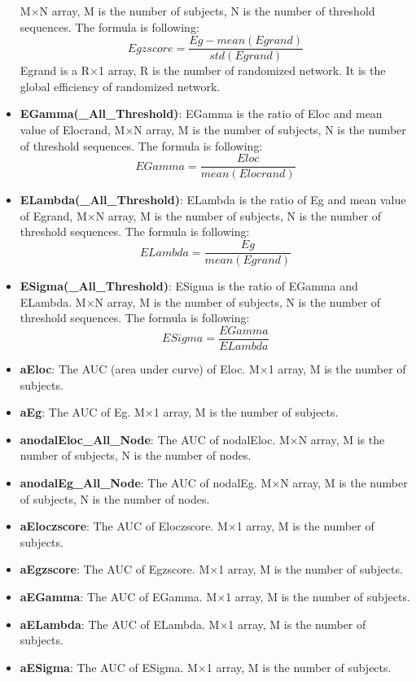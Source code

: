 \documentclass[11pt]{article}
\begin{document}
\begin{itemize}
						M$\times$N array, M is the number of subjects, N is the number of threshold sequences.
						The formula is following:
						$$Egzscore=\frac{Eg-mean(Egrand)}{std(Egrand)}$$
						Egrand is a R$\times$1 array, R is the number of randomized network. 
						It is the global efficiency of randomized network.
					\item \textbf{EGamma(\_All\_Threshold)}: EGamma is the ratio of Eloc and mean value of Elocrand,
						M$\times$N array, M is the number of subjects, N is the number of threshold sequences.
						The formula is following:
						$$EGamma=\frac{Eloc}{mean(Elocrand)}$$
					\item \textbf{ELambda(\_All\_Threshold)}: ELambda is the ratio of Eg and mean value of Egrand,
						M$\times$N array, M is the number of subjects, N is the number of threshold sequences.
						The formula is following:
						$$ELambda=\frac{Eg}{mean(Egrand)}$$
					\item \textbf{ESigma(\_All\_Threshold)}: ESigma is the ratio of EGamma and ELambda.
						M$\times$N array, M is the number of subjects, N is the number of threshold sequences.
						The formula is following:
						$$ESigma=\frac{EGamma}{ELambda}$$
					\item \textbf{aEloc}: The AUC (area under curve) of Eloc.
						M$\times$1 array, M is the number of subjects.
					\item \textbf{aEg}: The AUC of Eg.
						M$\times$1 array, M is the number of subjects.
					\item \textbf{anodalEloc\_All\_Node}: The AUC of nodalEloc.
						M$\times$N array, M is the number of subjects, N is the number of nodes.
					\item \textbf{anodalEg\_All\_Node}: The AUC of nodalEg.
						M$\times$N array, M is the number of subjects, N is the number of nodes.
					\item \textbf{aEloczscore}: The AUC of Eloczscore.
						M$\times$1 array, M is the number of subjects.
					\item \textbf{aEgzscore}: The AUC of Egzscore.
						M$\times$1 array, M is the number of subjects.
					\item \textbf{aEGamma}: The AUC of EGamma.
						M$\times$1 array, M is the number of subjects.
					\item \textbf{aELambda}: The AUC of ELambda.
						M$\times$1 array, M is the number of subjects.
					\item \textbf{aESigma}: The AUC of ESigma.
						M$\times$1 array, M is the number of subjects.
				\end{itemize}
\end{document}
